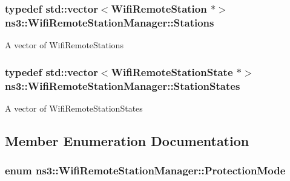 \subsubsection[{\texorpdfstring{Stations}{Stations}}]{\setlength{\rightskip}{0pt plus 5cm}typedef std\+::vector$<${\bf Wifi\+Remote\+Station} $\ast$$>$ {\bf ns3\+::\+Wifi\+Remote\+Station\+Manager\+::\+Stations}\hspace{0.3cm}{\ttfamily [private]}}\hypertarget{classns3_1_1WifiRemoteStationManager_a7b768b3ab57de5bb047d594b8636be40}{}\label{classns3_1_1WifiRemoteStationManager_a7b768b3ab57de5bb047d594b8636be40}
A vector of Wifi\+Remote\+Stations 
\subsubsection[{\texorpdfstring{Station\+States}{StationStates}}]{\setlength{\rightskip}{0pt plus 5cm}typedef std\+::vector$<${\bf Wifi\+Remote\+Station\+State} $\ast$$>$ {\bf ns3\+::\+Wifi\+Remote\+Station\+Manager\+::\+Station\+States}\hspace{0.3cm}{\ttfamily [private]}}\hypertarget{classns3_1_1WifiRemoteStationManager_a22b074985212bd285e2d7a35dbe2a392}{}\label{classns3_1_1WifiRemoteStationManager_a22b074985212bd285e2d7a35dbe2a392}
A vector of Wifi\+Remote\+Station\+States 

\subsection{Member Enumeration Documentation}
\subsubsection[{\texorpdfstring{Protection\+Mode}{ProtectionMode}}]{\setlength{\rightskip}{0pt plus 5cm}enum {\bf ns3\+::\+Wifi\+Remote\+Station\+Manager\+::\+Protection\+Mode}}\hypertarget{classns3_1_1WifiRemoteStationManager_acd7d97851233efb176637f24b3f8abd6}{}\label{classns3_1_1WifiRemoteStationManager_acd7d97851233efb176637f24b3f8abd6}


